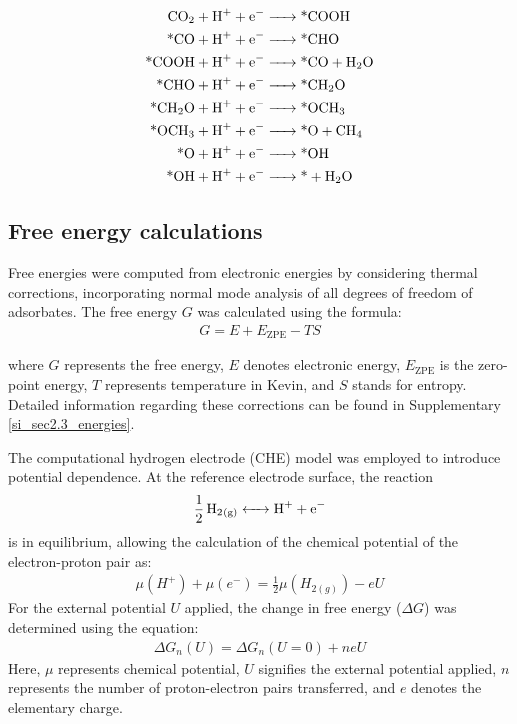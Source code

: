 \begin{align}
\ce{CO2 + H+ + e-          &-> \text{*}COOH}      \label{main_eq1:co2rr1}    \\
\ce{\text{*}CO + H+ + e-   &-> \text{*}CHO}       \label{main_eq3:co2rr3}    \\
\ce{\text{*}COOH + H+ + e- &-> \text{*}CO + H2O}  \label{main_eq2:co2rr2}    \\
\ce{\text{*}CHO + H+ + e-  &-> \text{*}CH2O}      \label{main_eq4:co2rr4}    \\
\ce{\text{*}CH2O + H+ + e- &-> \text{*}OCH3}      \label{main_eq5:co2rr5}    \\
\ce{\text{*}OCH3 + H+ + e- &-> \text{*}O + CH4}   \label{main_eq6:co2rr6}    \\
\ce{\text{*}O + H+ + e-    &-> \text{*}OH}        \label{main_eq7:co2rr7}    \\
\ce{\text{*}OH + H+ + e-   &-> \text{*} + H2O}    \label{main_eq8:co2rr8}
\end{align}


\subsection{Free energy calculations}
Free energies were computed from electronic energies by considering thermal corrections, incorporating normal mode analysis of all degrees of freedom of adsorbates.
The free energy $\textit{G}$ was calculated using the formula:
\begin{align}
G = E + E_{\text{ZPE}} - TS  \label{main_eq9:free_energy}
\end{align}

where $\textit{G}$ represents the free energy, $\textit{E}$ denotes electronic energy, $\textit{E}_{\text{ZPE}}$ is the zero-point energy, $\textit{T}$ represents temperature in Kevin, and $\textit{S}$ stands for entropy.
Detailed information regarding these corrections can be found in Supplementary \cref{si_sec2.3_energies}.

The computational hydrogen electrode (CHE) model \cite{peterson2010copper, norskov2004origin} was employed to introduce potential dependence.
At the reference electrode surface, the reaction
\begin{align}
\ce{1/2H2_{(g)}  <-> H+ + e-}  \label{main_eq10:che}
\end{align}
is in equilibrium, allowing the calculation of the chemical potential of the electron-proton pair as:
\begin{align}
\mu(H^+) + \mu(e^-) = \frac{1}{2}\mu(H_{2(g)}) - eU  \label{main_eq11:che_potential}
\end{align}
For the external potential $\textit{U}$ applied, the change in free energy ($\Delta \textit{G}$) was determined using the equation:
\begin{align}
\Delta G_n(U) = \Delta G_n(U=0) + neU  \label{main_eq12:ext_potential_che}
\end{align}
Here, $\mu$ represents chemical potential, $\textit{U}$ signifies the external potential applied, $\textit{n}$ represents the number of proton-electron pairs transferred, and $\textit{e}$ denotes the elementary charge.


